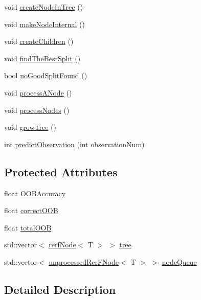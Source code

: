 \begin{DoxyCompactItemize}
void \hyperlink{classfp_1_1rerfTree_a44f22d50d958ac20c12cf6714811e67c}{create\+Node\+In\+Tree} ()
\item 
void \hyperlink{classfp_1_1rerfTree_adc3c8f338accaa401098a63d826390d3}{make\+Node\+Internal} ()
\item 
void \hyperlink{classfp_1_1rerfTree_a75ebcd9e258fdb49094e008e121bfe0a}{create\+Children} ()
\item 
void \hyperlink{classfp_1_1rerfTree_acd1bd04959e0537502a6abbd31bda7da}{find\+The\+Best\+Split} ()
\item 
bool \hyperlink{classfp_1_1rerfTree_aa266b3629b914f4ad01d8b1933a85ee2}{no\+Good\+Split\+Found} ()
\item 
void \hyperlink{classfp_1_1rerfTree_a69c175640d930d630504875e60b3b780}{process\+A\+Node} ()
\item 
void \hyperlink{classfp_1_1rerfTree_aa8281a45487868e4cf8e3dad9d9be8d3}{process\+Nodes} ()
\item 
void \hyperlink{classfp_1_1rerfTree_ae352b72e40a7f16c0042a0ff10564b6b}{grow\+Tree} ()
\item 
int \hyperlink{classfp_1_1rerfTree_a254ba4e644b4ad419809868ac34f6a44}{predict\+Observation} (int observation\+Num)
\end{DoxyCompactItemize}
\subsection*{Protected Attributes}
\begin{DoxyCompactItemize}
\item 
float \hyperlink{classfp_1_1rerfTree_a95ef33dc19b2956bb2320e3f89e966b0}{O\+O\+B\+Accuracy}
\item 
float \hyperlink{classfp_1_1rerfTree_a07330eb1a89870eb8d3c07d0c1af0ec9}{correct\+O\+OB}
\item 
float \hyperlink{classfp_1_1rerfTree_aaac789925d8100bf33cdbb440df8e593}{total\+O\+OB}
\item 
std\+::vector$<$ \hyperlink{classrerfNode}{rerf\+Node}$<$ T $>$ $>$ \hyperlink{classfp_1_1rerfTree_afc9392154cb4d1dde02e26a9ec31e356}{tree}
\item 
std\+::vector$<$ \hyperlink{classfp_1_1unprocessedRerFNode}{unprocessed\+Rer\+F\+Node}$<$ T $>$ $>$ \hyperlink{classfp_1_1rerfTree_a59b3bdcba86acbe93fd46658132218a8}{node\+Queue}
\end{DoxyCompactItemize}


\subsection{Detailed Description}
